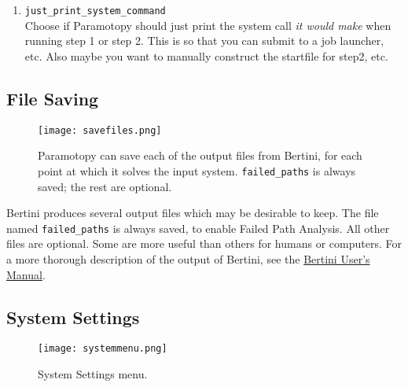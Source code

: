 \begin{enumerate}
	\item \verb|just_print_system_command| \\ Choose if Paramotopy should just print the system call \emph{it would make} when running step 1 or step 2.  This  is so that you can submit to a job launcher, etc.  Also maybe you want to manually construct the startfile for step2, etc.

\end{enumerate}


\subsection{File Saving}


\begin{figure}[h]
\begin{center}
\texttt{[image: savefiles.png]}
\caption[File Saving]{Paramotopy can save each of the output files from Bertini, for each point at which it solves the input system.  \texttt{failed\_paths} is always saved; the rest are optional.}
\label{screen:savefilesmenu}
\end{center}
\end{figure}

Bertini produces several output files which may be desirable to keep.  The file named \texttt{failed\_paths} is always saved, to enable Failed Path Analysis.  All other files are optional.  Some are more useful than others for humans or computers.  For a more thorough description of the output of Bertini, see the \href{https://www.nd.edu/~sommese/bertini/BertiniUsersManual.pdf}{Bertini User's Manual}.







\subsection{System Settings}
\begin{figure}[h]
\begin{center}
\texttt{[image: systemmenu.png]}
\caption[General Settings Menu]{System Settings menu.}
\label{screen:systemmenu}
\end{center}
\end{figure}

